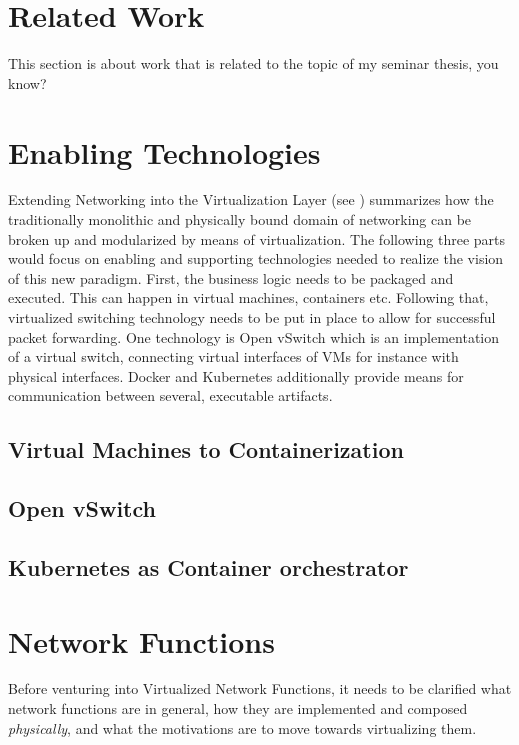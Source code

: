 

\section{Related Work}
This section is about work that is related to the topic of my seminar thesis, you know?

\section{Enabling Technologies}
Extending Networking into the Virtualization Layer (see \cite{pfaff2009extending}) summarizes how the traditionally monolithic and physically bound domain of networking can be broken up and modularized by means of virtualization. The following three parts would focus on enabling and supporting technologies needed to realize the vision of this new paradigm. First, the business logic needs to be packaged and executed. This can happen in virtual machines, containers etc. Following that, virtualized switching technology needs to be put in place to allow for successful packet forwarding. One technology is Open vSwitch which is an implementation of a virtual switch, connecting virtual interfaces of VMs for instance with physical interfaces. Docker and Kubernetes additionally provide means for communication between several, executable artifacts.
\subsection{Virtual Machines to Containerization}
\subsection{Open vSwitch}
\subsection{Kubernetes as Container orchestrator}

\quad

\section{Network Functions}
Before venturing into Virtualized Network Functions, it needs to be clarified what network functions are in general, how they are implemented and composed \textit{physically}, and what the motivations are to move towards virtualizing them. 
